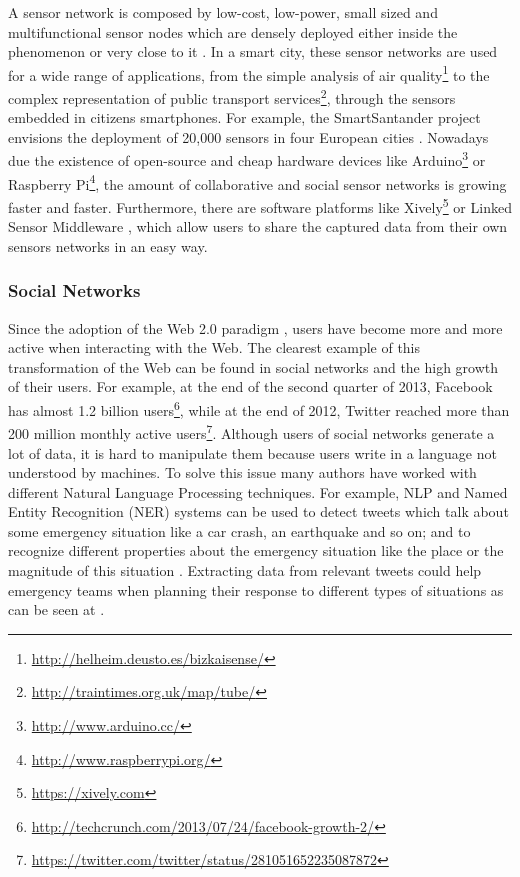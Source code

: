 A sensor network is composed by low-cost, low-power, small sized and multifunctional sensor nodes which are densely deployed either inside the phenomenon or very close to it \cite{akyildiz_survey_2002}. In a smart city, these sensor networks are used for a wide range of applications, from the simple analysis of air quality\footnote{\url{http://helheim.deusto.es/bizkaisense/}} to the complex representation of public transport services\footnote{\url{http://traintimes.org.uk/map/tube/}}, through the sensors embedded in citizens smartphones. For example, the SmartSantander project envisions the deployment of 20,000 sensors in four European cities \cite{sanchez_smartsantander:_2011}. Nowadays due the existence of open-source and cheap hardware devices like Arduino\footnote{\url{http://www.arduino.cc/}} or Raspberry Pi\footnote{\url{http://www.raspberrypi.org/}}, the amount of collaborative and social sensor networks is growing faster and faster. Furthermore, there are software platforms like Xively\footnote{\url{https://xively.com}} or Linked Sensor Middleware \cite{le-phuoc_linked_2011}, which allow users to share the captured data from their own sensors networks in an easy way.

\subsubsection{Social Networks}\label{social_networks}

Since the adoption of the Web 2.0 paradigm \cite{oreilly_what_2007}, users have become more and more active when interacting with the Web. The clearest example of this transformation of the Web can be found in social networks and the high growth of their users. For example, at the end of the second quarter of 2013, Facebook has almost 1.2 billion users\footnote{\url{http://techcrunch.com/2013/07/24/facebook-growth-2/}}, while at the end of 2012, Twitter reached more than 200 million monthly active users\footnote{\url{https://twitter.com/twitter/status/281051652235087872}}. Although users of social networks generate a lot of data, it is hard to manipulate them because users write in a language not understood by machines. To solve this issue many authors have worked with different Natural Language Processing techniques. For example, NLP and Named Entity Recognition (NER) systems \cite{maynard_named_2001} can be used to detect tweets which talk about some emergency situation like a car crash, an earthquake and so on; and to recognize different properties about the emergency situation like the place or the magnitude of this situation \cite{sixto_enable_????,martins_machine_2010}. Extracting data from relevant tweets could help emergency teams when planning their response to different types of situations as can be seen at \cite{abel_twitcident:_2012,vieweg_microblogging_2010,hughes_twitter_2009}.


